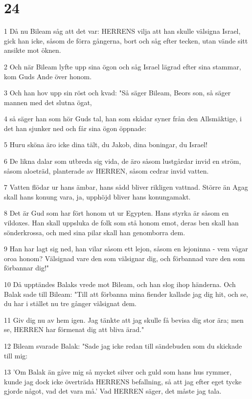 \chapter{24}

\par 1 Då nu Bileam såg att det var: HERRENS vilja att han skulle välsigna Israel, gick han icke, såsom de förra gångerna, bort och såg efter tecken, utan vände sitt ansikte mot öknen.
\par 2 Och när Bileam lyfte upp sina ögon och såg Israel lägrad efter sina stammar, kom Guds Ande över honom.
\par 3 Och han hov upp sin röst och kvad: "Så säger Bileam, Beors son, så säger mannen med det slutna ögat,
\par 4 så säger han som hör Guds tal, han som skådar syner från den Allsmäktige, i det han sjunker ned och får sina ögon öppnade:
\par 5 Huru sköna äro icke dina tält, du Jakob, dina boningar, du Israel!
\par 6 De likna dalar som utbreda sig vida, de äro såsom lustgårdar invid en ström, såsom aloeträd, planterade av HERREN, såsom cedrar invid vatten.
\par 7 Vatten flödar ur hans ämbar, hans sådd bliver rikligen vattnad. Större än Agag skall hans konung vara, ja, upphöjd bliver hans konungamakt.
\par 8 Det är Gud som har fört honom ut ur Egypten. Hans styrka är såsom en vildoxes. Han skall uppsluka de folk som stå honom emot, deras ben skall han sönderkrossa, och med sina pilar skall han genomborra dem.
\par 9 Han har lagt sig ned, han vilar såsom ett lejon, såsom en lejoninna - vem vågar oroa honom? Välsignad vare den som välsignar dig, och förbannad vare den som förbannar dig!"
\par 10 Då upptändes Balaks vrede mot Bileam, och han slog ihop händerna. Och Balak sade till Bileam: "Till att förbanna mina fiender kallade jag dig hit, och se, du har i stället nu tre gånger välsignat dem.
\par 11 Giv dig nu av hem igen. Jag tänkte att jag skulle få bevisa dig stor ära; men se, HERREN har förmenat dig att bliva ärad."
\par 12 Bileam svarade Balak: "Sade jag icke redan till sändebuden som du skickade till mig:
\par 13 'Om Balak än gåve mig så mycket silver och guld som hans hus rymmer, kunde jag dock icke överträda HERRENS befallning, så att jag efter eget tycke gjorde något, vad det vara må.' Vad HERREN säger, det måste jag tala.
